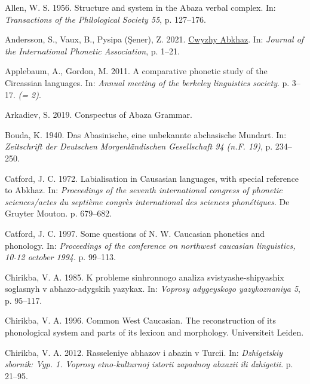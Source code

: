 \documentclass[
]{article}
\newlength{\cslhangindent}
\newlength{\cslentryspacingunit} %
\newenvironment{CSLReferences}[2] %
 {%
  \setlength{\parindent}{0pt}
  \ifodd #1
  \let\oldpar\par
  \def\par{\hangindent=\cslhangindent\oldpar}
  \fi
  \setlength{\parskip}{#2\cslentryspacingunit}
 }%
 {}
\begin{document}
\hypertarget{refs}{}
\begin{CSLReferences}{0}{0}
\leavevmode{}%
Allen, W. S. 1956. Structure and system in the {A}baza verbal complex.
In: \emph{\emph{Transactions of the Philological Society} 55}, p.
127--176.

\leavevmode{}%
Andersson, S., Vaux, B., Pysipa (Şener), Z. 2021.
\href{https://doi.org/10.1017/S0025100320000390}{Cwyzhy {A}bkhaz}. In:
\emph{\emph{Journal of the International Phonetic Association}}, p.
1--21.

\leavevmode{}%
Applebaum, A., Gordon, M. 2011. A comparative phonetic study of the
{C}ircassian languages. In: \emph{Annual meeting of the berkeley
linguistics society}. p. 3--17. \emph{(= 2)}.

\leavevmode{}%
Arkadiev, S. 2019. Conspectus of {A}baza {G}rammar.

\leavevmode{}%
Bouda, K. 1940. Das {A}basinische, eine unbekannte abchasische
{M}undart. In: \emph{\emph{Zeitschrift der Deutschen Morgenländischen
Gesellschaft} 94 (n.F. 19)}, p. 234--250.

\leavevmode{}%
Catford, J. C. 1972. Labialisation in {C}ausasian languages, with
special reference to {A}bkhaz. In: \emph{Proceedings of the seventh
international congress of phonetic sciences/actes du septi{è}me
congr{è}s international des sciences phon{é}tiques}. De Gruyter Mouton.
p. 679--682.

\leavevmode{}%
Catford, J. C. 1997. Some questions of {N}. {W}. {C}aucasian phonetics
and phonology. In: \emph{Proceedings of the conference on northwest
caucasian linguistics, 10-12 october 1994}. p. 99--113.

\leavevmode{}%
Chirikba, V. A. 1985. K probleme sinhronnogo analiza
svistyashe-shipyashix soglasnyh v abhazo-adygskih yazykax. In:
\emph{\emph{Voprosy adygeyskogo yazykoznaniya} 5}, p. 95--117.

\leavevmode{}%
Chirikba, V. A. 1996. {C}ommon {W}est {C}aucasian. {T}he reconstruction
of its phonological system and parts of its lexicon and morphology.
Universiteit Leiden.

\leavevmode{}%
Chirikba, V. A. 2012. Rasseleniye abhazov i abazin v {T}urcii. In:
\emph{Dzhigetskiy sbornik: Vyp. 1. Voprosy etno-kulturnoj istorii
zapadnoy abxazii ili dzhigetii}. p. 21--95.


\end{CSLReferences}
\end{document}
